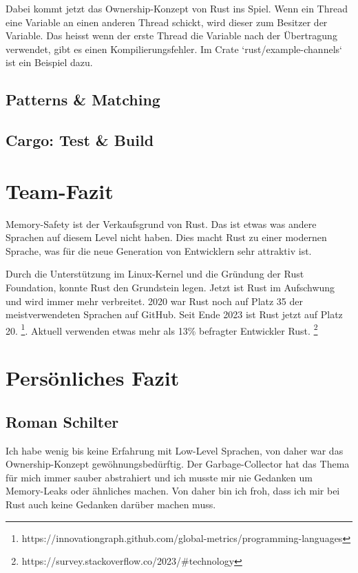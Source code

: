 \documentclass[letterpaper,12pt]{article}
\begin{document}
    Dabei kommt jetzt das Ownership-Konzept von Rust ins Spiel.
    Wenn ein Thread eine Variable an einen anderen Thread schickt, wird dieser zum Besitzer der Variable.
    Das heisst wenn der erste Thread die Variable nach der Übertragung verwendet, gibt es einen Kompilierungsfehler.
    Im Crate `rust/example-channels` ist ein Beispiel dazu.

    \subsection{Patterns \& Matching}\label{subsec:patterns-&-matching}

    \subsection{Cargo: Test \& Build}\label{subsec:cargo:-test-&-build}


    \section{Team-Fazit}\label{sec:team-fazit}
    Memory-Safety ist der Verkaufsgrund von Rust.
    Das ist etwas was andere Sprachen auf diesem Level nicht haben.
    Dies macht Rust zu einer modernen Sprache, was für die neue Generation von Entwicklern sehr attraktiv ist.

    Durch die Unterstützung im Linux-Kernel und die Gründung der Rust Foundation, konnte Rust den Grundstein legen.
    Jetzt ist Rust im Aufschwung und wird immer mehr verbreitet.
    2020 war Rust noch auf Platz 35 der meistverwendeten Sprachen auf GitHub.
    Seit Ende 2023 ist Rust jetzt auf Platz 20. \footnote{https://innovationgraph.github.com/global-metrics/programming-languages}.
    Aktuell verwenden etwas mehr als 13\% befragter Entwickler Rust. \footnote{https://survey.stackoverflow.co/2023/\#technology}


    \section{Persönliches Fazit}\label{sec:personliches-fazit}

    \subsection{Roman Schilter}\label{subsec:roman}
    Ich habe wenig bis keine Erfahrung mit Low-Level Sprachen, von daher war das Ownership-Konzept gewöhnungsbedürftig.
    Der Garbage-Collector hat das Thema für mich immer sauber abstrahiert und ich musste mir nie Gedanken um Memory-Leaks oder ähnliches machen.
    Von daher bin ich froh, dass ich mir bei Rust auch keine Gedanken darüber machen muss.
\end{document}
